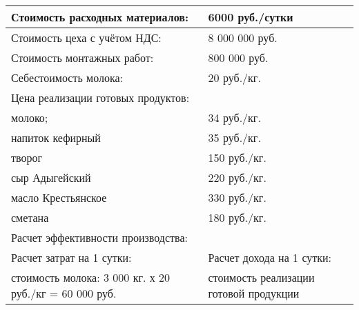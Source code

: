 \begin{table}[]
\begin{tabularx}{\textwidth}{|p{8.05cm}|p{8.05cm}|}
		Стоимость расходных материалов:                                         & 6000 руб./сутки                                                     \\ \hline
		Стоимость цеха с учётом НДС:                                            & 8 000 000 руб.                                                      \\ \hline
		Стоимость монтажных работ:                                              & 800 000 руб.                                                        \\ \hline
		Себестоимость молока:                                                   & 20 руб./кг.                                                         \\ \hline
		\multicolumn{2}{|l|}{Цена реализации готовых продуктов:}                                                                                      \\ \hline
		молоко;                                                                 & 34 руб./кг.                                                         \\ \hline
		напиток кефирный                                                        & 35 руб./кг.                                                         \\ \hline
		творог                                                                  & 150 руб./кг.                                                        \\ \hline
		сыр Адыгейский                                                          & 220 руб./кг.                                                        \\ \hline
		масло Крестьянское                                                      & 330 руб./кг.                                                        \\ \hline
		сметана                                                                 & 180 руб./кг.                                                        \\ \hline
		\multicolumn{2}{|l|}{Расчет эффективности производства:  }                                                                           \\ \hline
		Расчет затрат на 1 сутки:  																						 & Расчет дохода на 1 сутки:                                           \\ \hline
		 стоимость молока: 3 000 кг. х 20 руб./кг =  60 000 руб.                                              & стоимость реализации готовой продукции                              \\ \hline

\end{tabularx}
\end{table}
